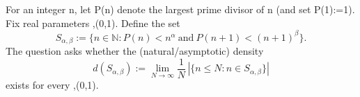 For an integer n, let P(n) denote the largest prime divisor of n (and set P(1):=1).
Fix real parameters \alpha,\beta\in(0,1).
Define the set
\[ S_{\alpha,\beta} := \{n\in\mathbb N: P(n) < n^{\alpha}\ \text{and}\ P(n+1) < (n+1)^{\beta}\}. \]
The question asks whether the (natural/asymptotic) density
\[ d(S_{\alpha,\beta}) := \lim_{N\to\infty} \frac{1}{N}\, |\{n\le N: n\in S_{\alpha,\beta}\}| \]
exists for every \alpha,\beta\in(0,1).
